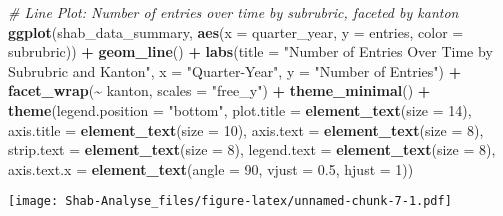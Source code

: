 \documentclass[
]{article}
\newenvironment{Shaded}{\begin{snugshade}}{\end{snugshade}}
\newcommand{\AttributeTok}[1]{\textcolor[rgb]{0.13,0.29,0.53}{#1}}
\newcommand{\CommentTok}[1]{\textcolor[rgb]{0.56,0.35,0.01}{\textit{#1}}}
\newcommand{\DecValTok}[1]{\textcolor[rgb]{0.00,0.00,0.81}{#1}}
\newcommand{\FloatTok}[1]{\textcolor[rgb]{0.00,0.00,0.81}{#1}}
\newcommand{\FunctionTok}[1]{\textcolor[rgb]{0.13,0.29,0.53}{\textbf{#1}}}
\newcommand{\NormalTok}[1]{#1}
\newcommand{\SpecialCharTok}[1]{\textcolor[rgb]{0.81,0.36,0.00}{\textbf{#1}}}
\newcommand{\StringTok}[1]{\textcolor[rgb]{0.31,0.60,0.02}{#1}}
\begin{document}
\begin{Shaded}
\begin{Highlighting}[]
\CommentTok{\# Line Plot: Number of entries over time by subrubric, faceted by kanton}
\FunctionTok{ggplot}\NormalTok{(shab\_data\_summary, }\FunctionTok{aes}\NormalTok{(}\AttributeTok{x =}\NormalTok{ quarter\_year, }\AttributeTok{y =}\NormalTok{ entries, }\AttributeTok{color =}\NormalTok{ subrubric)) }\SpecialCharTok{+}
  \FunctionTok{geom\_line}\NormalTok{() }\SpecialCharTok{+}
  \FunctionTok{labs}\NormalTok{(}\AttributeTok{title =} \StringTok{"Number of Entries Over Time by Subrubric and Kanton"}\NormalTok{, }\AttributeTok{x =} \StringTok{"Quarter{-}Year"}\NormalTok{, }\AttributeTok{y =} \StringTok{"Number of Entries"}\NormalTok{) }\SpecialCharTok{+}
  \FunctionTok{facet\_wrap}\NormalTok{(}\SpecialCharTok{\textasciitilde{}}\NormalTok{ kanton, }\AttributeTok{scales =} \StringTok{"free\_y"}\NormalTok{) }\SpecialCharTok{+}
  \FunctionTok{theme\_minimal}\NormalTok{() }\SpecialCharTok{+}
  \FunctionTok{theme}\NormalTok{(}\AttributeTok{legend.position =} \StringTok{"bottom"}\NormalTok{,}
        \AttributeTok{plot.title =} \FunctionTok{element\_text}\NormalTok{(}\AttributeTok{size =} \DecValTok{14}\NormalTok{),}
        \AttributeTok{axis.title =} \FunctionTok{element\_text}\NormalTok{(}\AttributeTok{size =} \DecValTok{10}\NormalTok{),}
        \AttributeTok{axis.text =} \FunctionTok{element\_text}\NormalTok{(}\AttributeTok{size =} \DecValTok{8}\NormalTok{),}
        \AttributeTok{strip.text =} \FunctionTok{element\_text}\NormalTok{(}\AttributeTok{size =} \DecValTok{8}\NormalTok{),}
        \AttributeTok{legend.text =} \FunctionTok{element\_text}\NormalTok{(}\AttributeTok{size =} \DecValTok{8}\NormalTok{),}
        \AttributeTok{axis.text.x =} \FunctionTok{element\_text}\NormalTok{(}\AttributeTok{angle =} \DecValTok{90}\NormalTok{, }\AttributeTok{vjust =} \FloatTok{0.5}\NormalTok{, }\AttributeTok{hjust =} \DecValTok{1}\NormalTok{))}
\end{Highlighting}
\end{Shaded}

\texttt{[image: Shab-Analyse\_files/figure-latex/unnamed-chunk-7-1.pdf]}
\end{document}
